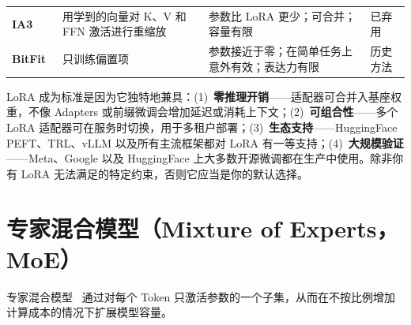 \begin{table}[ht!]
\begin{tabularx}{\linewidth}{@{}l Z{1.21} Z{1.51} Z{0.3}@{}}
\textbf{IA3}~\cite{liu2022ia3} & 用学到的向量对 K、V 和 FFN 激活进行重缩放 & 参数比 LoRA 更少；可合并；容量有限 & 已弃用 \\
\textbf{BitFit}~\cite{zaken2022bitfit} & 只训练偏置项 & 参数接近于零；在简单任务上意外有效；表达力有限 & 历史方法 \\
\bottomrule
\end{tabularx}
\end{table}

\begin{intuitionbox}
LoRA 成为标准是因为它独特地兼具：(1)~\textbf{零推理开销}——适配器可合并入基座权重，不像 Adapters 或前缀微调会增加延迟或消耗上下文；(2)~\textbf{可组合性}——多个 LoRA 适配器可在服务时切换，用于多租户部署；(3)~\textbf{生态支持}——HuggingFace PEFT、TRL、vLLM 以及所有主流框架都对 LoRA 有一等支持；(4)~\textbf{大规模验证}——Meta、Google 以及 HuggingFace 上大多数开源微调都在生产中使用。除非你有 LoRA 无法满足的特定约束，否则它应当是你的默认选择。
\end{intuitionbox}

\clearpage
\section{专家混合模型（Mixture of Experts，MoE）}
\label{mixture-of-experts-moe}

专家混合模型~\cite{shazeer2017outrageously, jiang2024mixtral} 通过对每个 Token 只激活参数的一个子集，从而在不按比例增加计算成本的情况下扩展模型容量。

